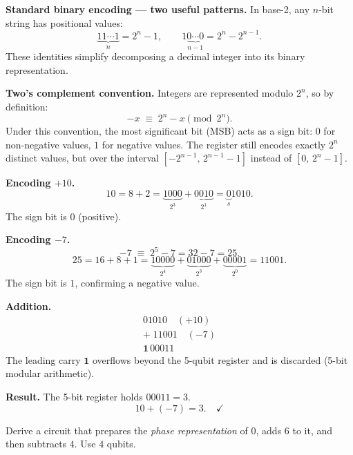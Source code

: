 \documentclass{ceri/sty/rapport}
\newcounter{exercice}[section]
\begin{document}
\begin{solution}

\textbf{Standard binary encoding — two useful patterns.}
In base-2, any $n$-bit string has positional values:
\[
  \underbrace{11\cdots1}_{n} = 2^n - 1,
  \qquad
  1\underbrace{0\cdots0}_{n-1} = 2^n - 2^{n-1}.
\]
These identities simplify decomposing a decimal integer into its binary representation.

\medskip\noindent\textbf{Two's complement convention.}
Integers are represented modulo $2^n$, so by definition:
\[
  -x \;\equiv\; 2^n - x \pmod{2^n}.
\]
Under this convention, the most significant bit (MSB) acts as a sign bit: $0$ for non-negative values, $1$ for negative values.
The register still encodes exactly $2^n$ distinct values, but over the interval $[-2^{n-1},\, 2^{n-1}-1]$ instead of $[0,\, 2^n-1]$.

\medskip\noindent\textbf{Encoding $+10$.}
\[
  10 = 8 + 2 = \underbrace{1000}_{2^3} + \underbrace{0010}_{2^1}
     = \underbrace{0}_{s}1010.
\]
The sign bit is $0$ (positive).

\medskip\noindent\textbf{Encoding $-7$.}
\[
  -7 \;\equiv\; 2^5 - 7 = 32 - 7 = 25.
\]
\[
  25 = 16 + 8 + 1
     = \underbrace{10000}_{2^4} + \underbrace{01000}_{2^3} + \underbrace{00001}_{2^0}
     = 11001.
\]
The sign bit is $1$, confirming a negative value.

\medskip\noindent\textbf{Addition.}
\[
\begin{array}{r}
  01010 \quad (+10) \\
+\; 11001 \quad (-7) \\\hline
\mathbf{1}\,00011
\end{array}
\]
The leading carry $\mathbf{1}$ overflows beyond the 5-qubit register and is discarded (5-bit modular arithmetic).

\medskip\noindent\textbf{Result.}
The 5-bit register holds $00011 = 3$.
\[
  10 + (-7) = 3. \quad\checkmark
\]

\end{solution}

\begin{exercice}
Derive a circuit that prepares the \emph{phase representation} of $0$, adds $6$
to it, and then subtracts $4$. Use $4$ qubits.
\end{exercice}
\end{document}
